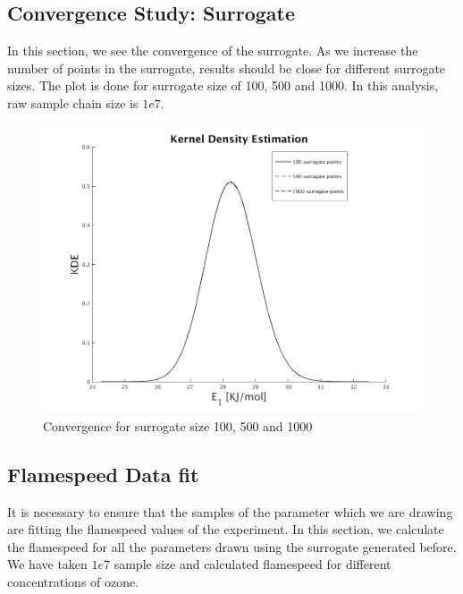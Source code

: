 \subsection{Convergence Study: Surrogate }

 In this section, we see the convergence of the surrogate. As we increase the number of points in the surrogate, results should be close for different surrogate sizes. The plot is done for surrogate size of 100, 500 and 1000. In this analysis, raw sample chain size is $1e7$.

\begin{figure}[H]
\includegraphics[scale=0.5]{model_1/conv_surrogate}
    \caption{Convergence for surrogate size 100, 500 and 1000}
\end{figure}


\subsection{Flamespeed Data fit}

 It is necessary to ensure that the samples of the parameter which we are drawing are fitting the flamespeed values of the experiment. In this section, we calculate the flamespeed for all the parameters drawn using the surrogate generated before. We have taken $1e7$ sample size and calculated flamespeed for different concentrations of ozone.

